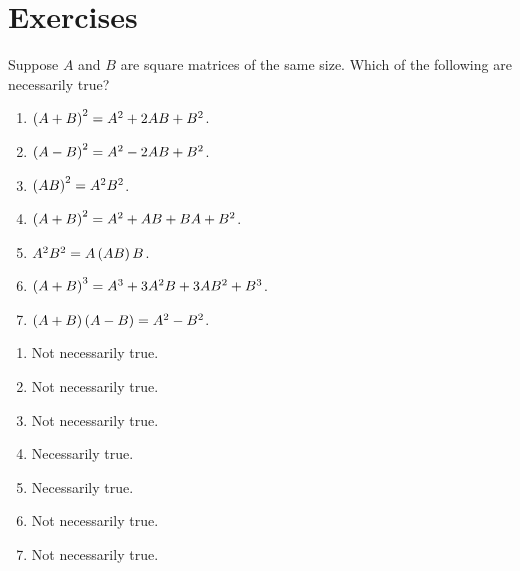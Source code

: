 \section*{Exercises}

\begin{enumialphparenastyle}

\begin{ex}
  Suppose $A$ and $B$ are square matrices of the same size. Which of
  the following are necessarily true?

  \begin{enumerate}
  \item $\left(A+B\right) ^{2}=A^{2}+2AB+B^{2}$.
  \item $\left(A-B\right) ^{2}=A^{2}-2AB+B^{2}$.
  \item $\left(AB\right) ^{2}=A^{2}B^{2}$.
  \item $\left(A+B\right) ^{2}=A^{2}+AB+BA+B^{2}$.
  \item $A^{2}B^{2}=A\left(AB\right) B$.
  \item $\left(A+B\right) ^{3}=A^{3}+3A^{2}B+3AB^{2}+B^{3}$.
  \item $\left(A+B\right) \left(A-B\right) =A^{2}-B^{2}$.
  \end{enumerate}

  \begin{sol}
    \begin{enumerate}
    \item Not necessarily true.  
    \item Not necessarily true.
    \item Not necessarily true.
    \item Necessarily true.
    \item Necessarily true.
    \item Not necessarily true.
    \item Not necessarily true. 
    \end{enumerate}
  \end{sol}
\end{ex}

\end{enumialphparenastyle}
